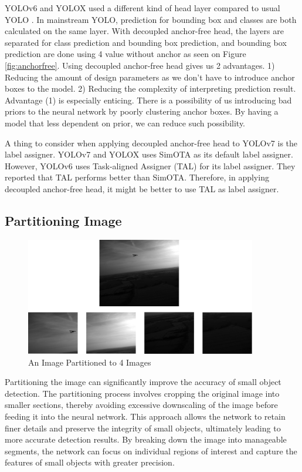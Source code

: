   YOLOv6 and YOLOX used a different kind of head layer compared to usual YOLO \parencites{yolox}{yolov6}. 
  In mainstream YOLO, prediction for bounding box and classes are both calculated on the same layer.
  With decoupled anchor-free head, the layers are separated for class prediction and bounding box prediction, and
  bounding box prediction are done using 4 value without anchor as seen on Figure \ref{fig:anchorfree}. 
  Using decoupled anchor-free head gives us 2 advantages. 1) Reducing the amount of design parameters as 
  we don't have to introduce anchor boxes to the model. 2) Reducing the complexity of interpreting prediction
  result. Advantage (1) is especially enticing. There is a possibility of us introducing bad priors to the neural
  network by poorly clustering anchor boxes. By having a model that less dependent on prior, we can reduce such possibility.

  A thing to consider when applying decoupled anchor-free head to YOLOv7 is the label assigner. YOLOv7 and YOLOX uses SimOTA as its default
  label assigner. However, \textcite{yolov6} YOLOv6 uses Task-aligned Assigner (TAL) for its label assigner. They reported that TAL performs
  better than SimOTA. Therefore, in applying decoupled anchor-free head, it might be better to use TAL as label assigner.

  \subsection{Partitioning Image}
  \begin{figure}[H]
    \centering
    \includegraphics[width=0.9\textwidth]{figures/imagepartition.png}
    \caption{An Image Partitioned to 4 Images}
    \label{fig:imagepartition}
  \end{figure}
  Partitioning the image can significantly improve the accuracy of small object detection.
  The partitioning process involves cropping the original image into smaller sections, thereby avoiding excessive downscaling of the image before feeding it into the neural network.
  This approach allows the network to retain finer details and preserve the integrity of small objects, ultimately leading to more accurate detection results.
  By breaking down the image into manageable segments, the network can focus on individual regions of interest and capture the features of small objects with greater precision. 

